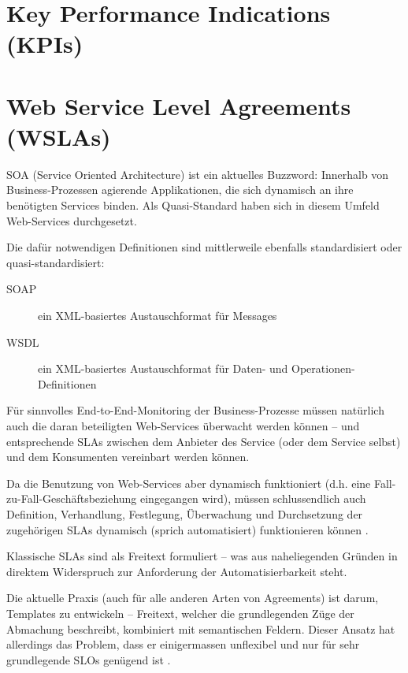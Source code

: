\documentclass[11pt,listof=totoc]{scrreprt} %
\theoremstyle{definition}
\begin{document}
\section{Key Performance Indications (KPIs)}

\section{Web Service Level Agreements (WSLAs)}

SOA (Service Oriented Architecture) ist ein aktuelles Buzzword: Innerhalb von Business-Prozessen agierende Applikationen, die sich dynamisch an ihre benötigten Services binden. Als Quasi-Standard haben sich in diesem Umfeld Web-Services durchgesetzt.

Die dafür notwendigen Definitionen sind mittlerweile ebenfalls standardisiert oder quasi-standardisiert:
\begin{description}
\item[SOAP] ein XML-basiertes Austauschformat für Messages \cite{wiki:soap}
\item[WSDL] ein XML-basiertes Austauschformat für Daten- und Operationen-Definitionen \cite{wiki:wsdl}
\end{description}

Für sinnvolles End-to-End-Monitoring der Business-Prozesse müssen natürlich auch die daran beteiligten Web-Services überwacht werden können -- und entsprechende SLAs zwischen dem Anbieter des Service (oder dem Service selbst) und dem Konsumenten vereinbart werden können.

Da die Benutzung von Web-Services aber dynamisch funktioniert (d.h. eine Fall-zu-Fall-Geschäftsbeziehung eingegangen wird), müssen schlussendlich auch Definition, Verhandlung, Festlegung, Überwachung und Durchsetzung der zugehörigen SLAs dynamisch (sprich automatisiert) funktionieren können \cite{ibm:wslaPaper}.

Klassische SLAs sind als Freitext formuliert -- was aus naheliegenden Gründen in direktem Widerspruch zur Anforderung der Automatisierbarkeit steht.

Die aktuelle Praxis (auch für alle anderen Arten von Agreements) ist darum, Templates zu entwickeln -- Freitext, welcher die grundlegenden Züge der Abmachung beschreibt, kombiniert mit semantischen Feldern. Dieser Ansatz hat allerdings das Problem, dass er einigermassen unflexibel und nur für sehr grundlegende SLOs genügend ist \cite{ibm:wslaPaper}.
\end{document}
